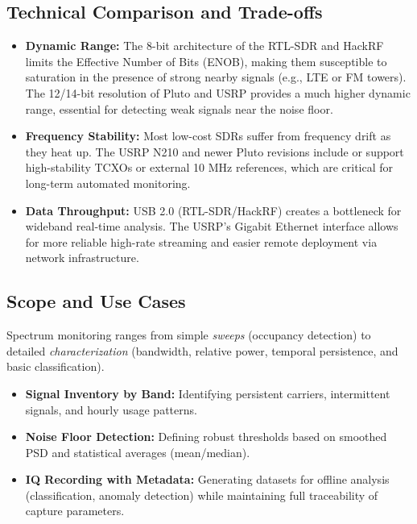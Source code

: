 \documentclass[11pt]{report}
\begin{document}
\subsection*{Technical Comparison and Trade-offs}
\begin{itemize}[leftmargin=*]
\item \textbf{Dynamic Range:} The 8-bit architecture of the RTL-SDR and HackRF limits the Effective Number of Bits (ENOB), making them susceptible to saturation in the presence of strong nearby signals (e.g., LTE or FM towers). The 12/14-bit resolution of Pluto and USRP provides a much higher dynamic range, essential for detecting weak signals near the noise floor.
\item \textbf{Frequency Stability:} Most low-cost SDRs suffer from frequency drift as they heat up. The USRP N210 and newer Pluto revisions include or support high-stability TCXOs or external 10 MHz references, which are critical for long-term automated monitoring.
\item \textbf{Data Throughput:} USB 2.0 (RTL-SDR/HackRF) creates a bottleneck for wideband real-time analysis. The USRP's Gigabit Ethernet interface allows for more reliable high-rate streaming and easier remote deployment via network infrastructure.
\end{itemize}

\subsection*{Scope and Use Cases}
Spectrum monitoring ranges from simple \textit{sweeps} (occupancy detection) to detailed \textit{characterization} (bandwidth, relative power, temporal persistence, and basic classification).
\begin{itemize}[leftmargin=*]
\item \textbf{Signal Inventory by Band:} Identifying persistent carriers, intermittent signals, and hourly usage patterns.
\item \textbf{Noise Floor Detection:} Defining robust thresholds based on smoothed PSD and statistical averages (mean/median).
\item \textbf{IQ Recording with Metadata:} Generating datasets for offline analysis (classification, anomaly detection) while maintaining full traceability of capture parameters.
\end{itemize}
\end{document}
